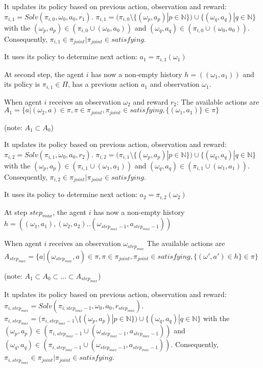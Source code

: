 \documentclass{ecai}
\begin{document}
    It updates its policy based on previous action, observation and reward: $\pi_{i,1} = Solv(\pi_{i,0}, \omega_0, a_0, r_1)$.
    $\pi_{i,1} = (\pi_{i,0} \setminus \{(\omega_p, a_p) | p \in \mathbb{N}\}) \cup \{(\omega_q, a_q) | q \in \mathbb{N}\}$ with the $(\omega_p, a_p) \in (\pi_{i,0} \cup {(\omega_0, a_0)})$ and $(\omega_q, a_q) \in (\pi_{i,0} \cup {(\omega_0, a_0)})$. Consequently, $\pi_{i,1} \in \pi_{joint} | \pi_{joint} \in satisfying$.


    It uses its policy to determine next action: $a_1 = \pi_{i,1}(\omega_1)$

    At second step, the agent $i$ has now a non-empty history $h = ((\omega_1, a_1))$ and its policy is $\pi_{i,1} \in \Pi$, has a previous action $a_1$ and observation $\omega_1$.

    When agent $i$ receives an observation $\omega_{2}$ and reward $r_2$:
    The available actions are $A_1 = \{a | (\omega_2, a) \in \pi, \pi \in \pi_{joint},\pi_{joint} \in satisfying, \{(\omega_1, a_1)\} \in \pi\}$

    (note: $A_1 \subset A_0$)

    It updates its policy based on previous action, observation and reward: $\pi_{i,2} = Solv(\pi_{i,1}, \omega_0, a_0, r_2)$.
    $\pi_{i,2} = (\pi_{i,1} \setminus \{(\omega_p, a_p) | p \in \mathbb{N}\}) \cup \{(\omega_q, a_q) | q \in \mathbb{N}\}$ with the $(\omega_p, a_p) \in (\pi_{i,1} \cup {(\omega_1, a_1)})$ and $(\omega_q, a_q) \in (\pi_{i,1} \cup {(\omega_1, a_1)})$. Consequently, $\pi_{i,2} \in \pi_{joint} | \pi_{joint} \in satisfying$.

    It uses its policy to determine next action: $a_2 = \pi_{i,2}(\omega_2)$

    At step $step_{max}$, the agent $i$ has now a non-empty history $h = ((\omega_1, a_1), (\omega_2, a_2)..(\omega_{step_{max}-1}, a_{step_{max}-1}))$

    When agent $i$ receives an observation $\omega_{step_{max}}$
    The available actions are $A_{step_{max}} = \{a | (\omega_{step_{max}}, a) \in \pi, \pi \in \pi_{joint},\pi_{joint} \in satisfying, \{(\omega', a') \in h\} \in \pi\}$

    (note: $A_1 \subset A_0 \subset \dots \subset A_{step_{max}}$)

    It updates its policy based on previous action, observation and reward: $\pi_{i,step_{max}} = Solv(\pi_{i,step_{max}-1}, \omega_0, a_0, r_{step_{max}})$.
    $\pi_{i,step_{max}} = (\pi_{i,step_{max}-1} \setminus \{(\omega_p, a_p) | p \in \mathbb{N}\}) \cup \{(\omega_q, a_q) | q \in \mathbb{N}\}$ with the $(\omega_p, a_p) \in (\pi_{i,step_{max}-1} \cup {(\omega_{step_{max}-1}, a_{step_{max}-1})})$ and $(\omega_q, a_q) \in (\pi_{i,step_{max}-1} \cup {(\omega_{step_{max}-1}, a_{step_{max}-1})})$. Consequently, $\pi_{i,step_{max}} \in \pi_{joint} | \pi_{joint} \in satisfying$.
\end{document}
